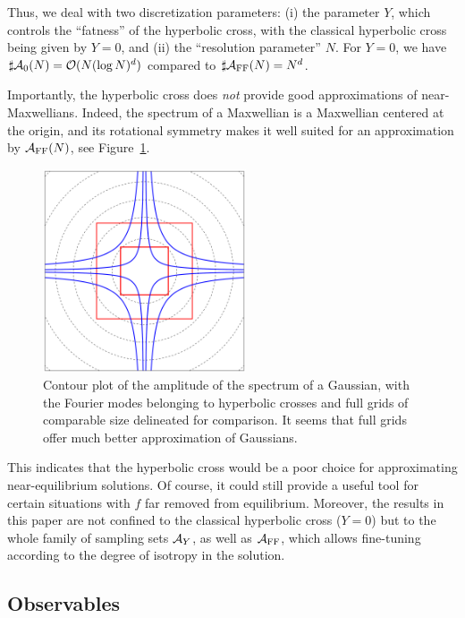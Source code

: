 Thus, we deal with two discretization parameters: (i) the parameter $Y$, which controls the ``fatness'' of the
hyperbolic cross, with the classical hyperbolic cross being given by $Y=0$, and (ii) the ``resolution
parameter'' $N$.  For $Y=0$, we have $\sharp\mathcal{A}_0(N)=\mathcal{O}(N(\log N)^d)$ compared to $\sharp\mathcal{A}_\text{FF}(N)=N^d$.

Importantly, the hyperbolic cross does {\em not} provide good approximations of near-Maxwellians. Indeed, the
spectrum of a Maxwellian is a Maxwellian centered at the origin, and its rotational symmetry makes it well
suited for an approximation by $\mathcal{A}_\text{FF}(N)$, see Figure~\ref{fig:hcgauss}.

\begin{figure}
    \centering
    \includegraphics[width=6cm]{figs/hcboltz/hcgauss}
    \caption{Contour plot of the amplitude of the spectrum of a Gaussian, with the
             Fourier modes belonging to hyperbolic crosses and full grids of
             comparable size delineated for comparison. It seems that full
             grids offer much better approximation of Gaussians.}
    \label{fig:hcgauss}
\end{figure}

This indicates that the hyperbolic cross would be a poor choice for approximating
near-equilibrium solutions.  Of course, it could still provide a useful tool for
certain situations with $f$ far removed from equilibrium.  Moreover, the results
in this paper are not confined to the classical hyperbolic cross ($Y=0$) but to
the whole family of sampling sets $\mathcal{A}_Y$, as well as $\mathcal{A}_\text{FF}$, which allows
fine-tuning according to the degree of isotropy in the solution.

\subsection{Observables}

